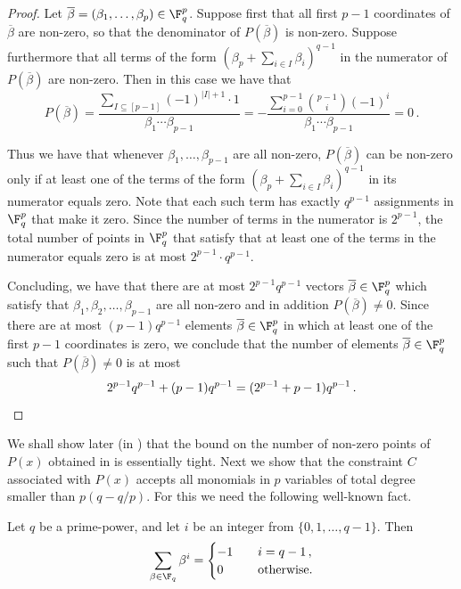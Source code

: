 \begin{proof}
Let $\overline \beta= (\beta_1,\ldots,\beta_p) \in \F_q^p$. Suppose first that all first $p-1$ coordinates of $\overline \beta$ are non-zero, so that the denominator of $P(\overline \beta)$ is non-zero. Suppose furthermore that all terms of the form $(\beta_p + \sum_{i \in I} \beta_i)^{q-1}$ in the numerator of $P(\overline \beta)$ are non-zero. Then in this case we have that
\[P(\overline \beta) = \frac {\sum_{ I \subseteq [p-1]} (-1)^{|I|+1} \cdot 1 } {\beta_1 \cdots \beta_{p-1}} =  -\frac {\sum_{i=0}^{p-1} \binom {p-1} {i} (-1)^{i} } {\beta_1 \cdots \beta_{p-1}}  = 0 \,.\]

Thus we have that whenever $\beta_1,\ldots,\beta_{p-1}$ are all non-zero, $P(\overline \beta)$ can be non-zero only if at least one of the terms of the form $(\beta_p + \sum_{i \in I} \beta_i)^{q-1}$ in its numerator equals zero. Note that each such term has exactly $q^{p-1}$ assignments in $\F_q^p$ that make it zero. Since the number of terms in the numerator is $2^{p-1}$,
the total number of points in $\F_q^p$ that satisfy that at least one of the terms in the numerator equals zero is at most
$2^{p-1}\cdot  q^{p-1}$.

Concluding, we have that there are at most $2^{p-1} q^{p-1}$ vectors $\overline \beta \in \F_q^p$ which satisfy that $\beta_1,\beta_2,\ldots,\beta_{p-1}$ are all non-zero and in addition $P(\overline \beta) \neq 0$. Since there are at most
$(p-1)q^{p-1}$ elements $\overline \beta \in \F_q^p$ in which at least one of the first $p-1$ coordinates is zero, we conclude that the number of elements $\overline \beta \in \F_q^p$ such that $P(\overline \beta) \neq 0$ is at most \[2^{p-1} q^{p-1} + (p-1)q^{p-1} =
(2^{p-1}+p-1)q^{p-1}\,.\qedhere\] 
\end{proof}

We shall show later (in ) that the bound on the number of non-zero points of $P(x)$ obtained in  is essentially tight.
Next we show that the constraint $C$ associated with  $P(x)$ accepts all monomials in $p$ variables of total degree smaller than $p(q-q/p)$.
For this we need the following well-known fact.

\begin{claim}\label{claim:power-sum}
Let $q$ be a prime-power, and let $i$ be an integer 
%
from
$\{0,1,\ldots,q-1\}$. Then
\[\sum_{\beta \in \F_q} \beta^i = \begin{cases}
  -1 & \quad i = q-1\,, \\
  0 & \quad \text{otherwise.}
\end{cases}
 \]
\end{claim}

